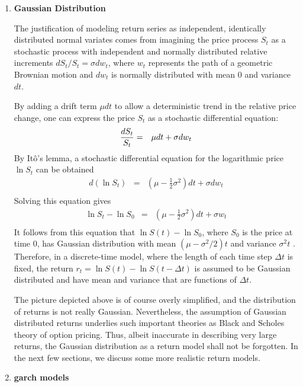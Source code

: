 \begin{enumerate}
\item{\bf Gaussian Distribution}

The justification of modeling return series as independent,
identically distributed normal variates comes from imagining the
price process $S_t$ as a stochastic process with
  independent and normally distributed relative increments $dS_t / S_t
  = \sigma dw_t$, where $w_t$ represents the path of a geometric
  Brownian motion and $dw_t$ is normally distributed with mean 0 and
  variance $dt$.

By adding a drift term $\mu dt$ to allow a deterministic trend in the
relative price change, one can express the price $S_t$ as a stochastic
differential equation:
\begin{eqnarray*}
  {dS_t \over S_t} &=& \mu dt + \sigma dw_t \\
\end{eqnarray*}
By It\^o's lemma, a stochastic differential
equation for the logarithmic price $\ln S_t$ can be obtained
\begin{eqnarray*}
  d(\ln S_t) &=& (\mu - \frac{1}{2} \sigma^2)dt + \sigma dw_t \\
\end{eqnarray*}
Solving this equation gives
\begin{eqnarray*}
  \ln S_t - \ln S_0 &=& (\mu - \frac{1}{2} \sigma^2)dt + \sigma w_t \\
\end{eqnarray*}
It follows from this equation that $\ln S(t) - \ln S_0$, where $S_0$
is the price at time 0, has Gaussian distribution with mean $(\mu -
\sigma^2/2)t$ and variance $\sigma^2 t$ \cite{Bernt2000}. Therefore,
in a discrete-time model, where the length of each time step $\Delta
t$ is fixed, the return $r_t = \ln S(t) - \ln S(t - \Delta t)$ is
assumed to be Gaussian distributed and have mean and variance that are
functions of $\Delta t$.

The picture depicted above is of course overly simplified, and the
distribution of returns is not really Gaussian. Nevertheless, the
assumption of Gaussian distributed returns underlies such important
theories as Black and Scholes theory of option pricing. Thus, albeit
inaccurate in describing very large returns, the Gaussian distribution
as a return model shall not be forgotten. In the next few sections,
we discuss some more realistic return models.

\item{\bf \gls{garch} models}


\end{enumerate}
